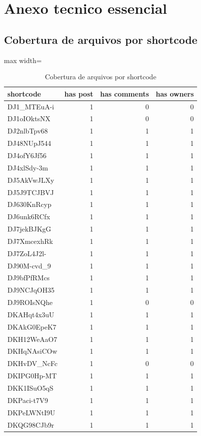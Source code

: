 \documentclass[12pt,a4paper]{article}
\begin{document}
\section{Anexo tecnico essencial}
\subsection{Cobertura de arquivos por shortcode}
\begin{table}[H]
\centering
\scriptsize
\begin{adjustbox}{max width=\textwidth}
\begin{tabular}{l r r r}
\toprule
shortcode & has post & has comments & has owners \\
\midrule
DJ1\_MTEuA-i & 1 & 0 & 0 \\
DJ1oIOktsNX & 1 & 0 & 0 \\
DJ2nlbTpv68 & 1 & 1 & 1 \\
DJ48NUpJ544 & 1 & 1 & 1 \\
DJ4ofY6Jf56 & 1 & 1 & 1 \\
DJ4xlSdy-3m & 1 & 1 & 1 \\
DJ5AkVwJLXy & 1 & 1 & 1 \\
DJ5J9TCJBVJ & 1 & 1 & 1 \\
DJ630KnRcyp & 1 & 1 & 1 \\
DJ6unk6RCfx & 1 & 1 & 1 \\
DJ7jekBJKgG & 1 & 1 & 1 \\
DJ7XmcexhRk & 1 & 1 & 1 \\
DJ7ZoL4J2l- & 1 & 1 & 1 \\
DJ90M-cvd\_9 & 1 & 1 & 1 \\
DJ9bfPfRMcs & 1 & 1 & 1 \\
DJ9NCJqOH35 & 1 & 1 & 1 \\
DJ9ROIsNQhe & 1 & 0 & 0 \\
DKAHqt4x3uU & 1 & 1 & 1 \\
DKAkG0EpeK7 & 1 & 1 & 1 \\
DKH12WeAaO7 & 1 & 1 & 1 \\
DKHqNAsiCOw & 1 & 1 & 1 \\
DKHvDV\_NcFc & 1 & 0 & 0 \\
DKIPG0Hp-MT & 1 & 1 & 1 \\
DKK1ISuO5qS & 1 & 1 & 1 \\
DKPaci-t7V9 & 1 & 1 & 1 \\
DKPeLWNtI9U & 1 & 1 & 1 \\
DKQG98CJb9r & 1 & 1 & 1 \\
\bottomrule
\end{tabular}
\end{adjustbox}
\caption{Cobertura de arquivos por shortcode}
\label{tab:estrutura}
\end{table}
\end{document}
